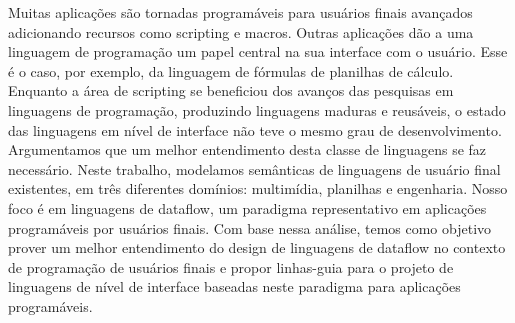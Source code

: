 
Muitas aplicações são tornadas programáveis para usuários finais avançados
adicionando recursos como scripting e macros. Outras aplicações dão
a uma linguagem de programação um papel central na sua interface com
o usuário. Esse é o caso, por exemplo, da linguagem de fórmulas de
planilhas de cálculo. Enquanto a área de scripting se beneficiou dos
avanços das pesquisas em linguagens de programação, produzindo linguagens
maduras e reusáveis, o estado das linguagens em nível de interface
não teve o mesmo grau de desenvolvimento. Argumentamos que um melhor
entendimento desta classe de linguagens se faz necessário. Neste trabalho,
modelamos semânticas de linguagens de usuário final existentes, em
três diferentes domínios: multimídia, planilhas e engenharia. Nosso
foco é em linguagens de dataflow, um paradigma representativo em aplicações
programáveis por usuários finais. Com base nessa análise, temos como
objetivo prover um melhor entendimento do design de linguagens de
dataflow no contexto de programação de usuários finais e propor linhas-guia
para o projeto de linguagens de nível de interface baseadas neste
paradigma para aplicações programáveis. 

